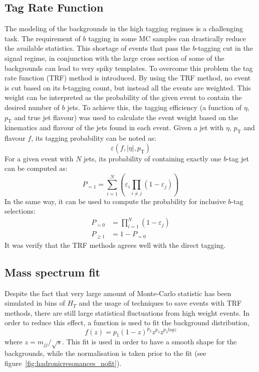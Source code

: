 \documentclass[a4paper,11pt]{article}
\newcommand{\pt}{\ensuremath{p_{\text{T}}}}
\newcommand*{\hht}{\ensuremath{H_{\ensuremath{T}}}}
\begin{document}
\subsection{Tag Rate Function}
\label{subsec:trf}
The modeling of the backgrounds in the high tagging regimes is a challenging task.
The requirement of $b$ tagging in some MC samples can drastically reduce the available statistics.
This shortage of events that pass the $b$-tagging cut in the signal regime, in conjunction with the large cross section of some of the backgrounds can lead to very spiky templates.
\newline
To overcome this problem the tag rate function (TRF) method is introduced.
By using the TRF method, no event is cut based on its $b$-tagging count, but instead all the events are weighted.
This weight can be interpreted as the probability of the given event to contain the desired number of $b$ jets.
To achieve this, the tagging efficiency (a function of $\eta$, $\pt$ and true jet flavour) was
used to calculate the event weight based on the kinematics and flavour of the jets found in each event.
\newline
Given a jet with $\eta$, $\pt$ and flavour $f$, its tagging probability can be noted as:
\begin{equation*}
	\varepsilon \left(f,|\eta|,\pt\right)
\end{equation*}
\newline
For a given event with $N$ jets, its probability of containing exactly one $b$-tag jet can be computed as:
\begin{equation*}
	P_{=1} = \sum\limits_{i=1}^N \left( \varepsilon_{i} \prod\limits_{i \neq j} \left( 1 - \varepsilon_{j} \right) \right)
\end{equation*}
\newline
In the same way, it can be used to compute the probability for inclusive $b$-tag selections:
\begin{align*}
	P_{=0} &= \prod\limits_{i=1}^N \left( 1 - \varepsilon_{j} \right) \\
	P_{\geq 1} &= 1 - P_{=0}
\end{align*}
\newline
It was verify that the TRF methods agrees well with the direct tagging.

\subsection{Mass spectrum fit}
Despite the fact that very large amount of Monte-Carlo statistic has been simulated in bins of $\hht$
and the usage of techniques to save events with TRF methods,
there are still large statistical fluctuations from high weight events.
In order to reduce this effect, a function is used to fit the background distribution,
\begin{equation}
f(z)=p_1(1-z)^{p_2}z^{p_3}z^{p_{4}logz}
\end{equation}
where $z=m_{jj}/\sqrt{s}$. This fit is used in order to have a smooth shape for the backgrounds, while the normalisation is taken prior to the fit (see figure~\ref{fig:hadronicresonances_nofit}).
\end{document}
